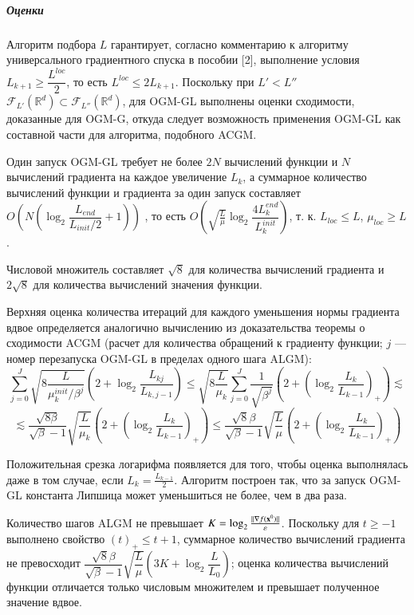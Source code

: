 \documentclass{crm-article}
\begin{document}
\subparagraph{Оценки}

Алгоритм подбора $L$ гарантирует, согласно комментарию к алгоритму универсального градиентного спуска в пособии [2], выполнение условия $L_{k+1}\geq \dfrac{L^{loc}}{2}$, то есть $L^{loc}\leq 2L_{k+1}$. Поскольку при $L' < L''$ $\mathcal{F}_{L'}(\mathbb{R}^d) \subset \mathcal{F}_{L''}(\mathbb{R}^d)$, для OGM-GL выполнены оценки сходимости, доказанные для OGM-G, откуда следует возможность применения OGM-GL как составной части для алгоритма, подобного ACGM.

Один запуск OGM-GL требует не более $2N$ вычислений функции и $N$ вычислений градиента на каждое увеличение $L_k$, а суммарное количество вычислений функции и градиента за один запуск составляет $O\left(N\left(\log_2\dfrac{L_{end}}{L_{init}/2}+1\right)\right)$ , то есть $O\left(\sqrt{\frac{L}{\mu}}\log_{2}\dfrac{4L_k^{end}}{L_k^{init}}\right)$, т. к. $L_{loc}\leq L$, $\mu_{loc}\geq L$.

Числовой множитель составляет $\sqrt{8}$ для количества вычислений градиента и $2\sqrt{8}$ для количества вычислений значения функции.

Верхняя оценка количества итераций для каждого уменьшения нормы градиента вдвое определяется аналогично вычислению из доказательства теоремы о сходимости ACGM (расчет для количества обращений к градиенту функции; $j$ --- номер перезапуска OGM-GL в пределах одного шага ALGM):
$$\sum\limits_{j=0}^J\sqrt{8\frac{L}{\mu_k^{init}/\beta^j}}\left(2+\log_2\dfrac{L_{kj}}{L_{k,j-1}}\right)\leq \sqrt{8\frac{L}{\mu_k}} \sum\limits_{j=0}^J\frac{1}{\sqrt{\beta^j}}\left(2+\left(\log_2\dfrac{L_k}{L_{k-1}}\right)_+\right)\lesssim$$
$$\lesssim \dfrac{\sqrt{8\beta}}{\sqrt{\beta} - 1}\sqrt{\dfrac{L}{\mu_k}}\left(2+\left(\log_2\dfrac{L_k}{L_{k-1}}\right)_+\right)\leq \dfrac{\sqrt{8} \beta}{\sqrt{\beta} - 1} \sqrt{\dfrac{L}{\mu}}\left(2+\left(\log_2\dfrac{L_k}{L_{k-1}}\right)_+\right)$$

Положительная срезка логарифма появляется для того, чтобы оценка выполнялась даже в том случае, если $L_k=\frac{L_{k-1}}{2}$. Алгоритм построен так, что за запуск OGM-GL константа Липшица может уменьшиться не более, чем в два раза.

Количество шагов ALGM не превышает $K=\log_2\frac{||\nabla f({\bf x}^0)||}{\varepsilon}$. Поскольку для $t\geq -1$ выполнено свойство $(t)_+\leq t+1$, суммарное количество вычислений градиента не превосходит $\dfrac{\sqrt{8} \beta}{\sqrt{\beta} - 1} \sqrt{\dfrac{L}{\mu}}\left(3K+\log_2\dfrac{L}{L_0}\right)$; оценка количества вычислений функции отличается только числовым множителем и превышает полученное значение вдвое.
\end{document}
